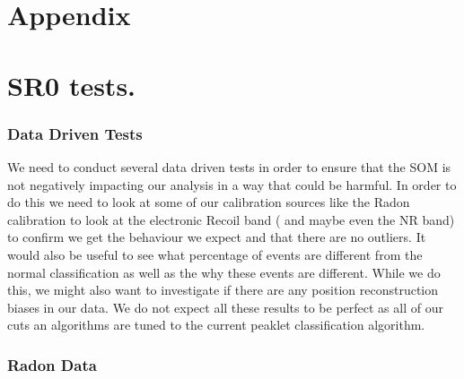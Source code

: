\documentclass[12pt]{article}
\begin{document}















\clearpage




%

\appendix

\section{Appendix}

\section{SR0 tests.}
\label{SR0_test}

\subsubsection{Data Driven Tests}

We need to conduct several data driven tests in order to ensure that the SOM is not negatively impacting our analysis in a way that could be harmful. In order to do this we need to look at some of our calibration sources like the Radon calibration to look at the electronic Recoil band ( and maybe even the NR band) to confirm we get the behaviour we expect and that there are no outliers. It would also be useful to see what percentage of events are different from the normal classification as well as the why these events are different. While we do this, we might also want to investigate if there are any position reconstruction biases in our data. We do not expect all these results to be perfect as all of our cuts an algorithms are tuned to the current peaklet classification algorithm. 

\subsubsection{Radon Data}
\end{document}
